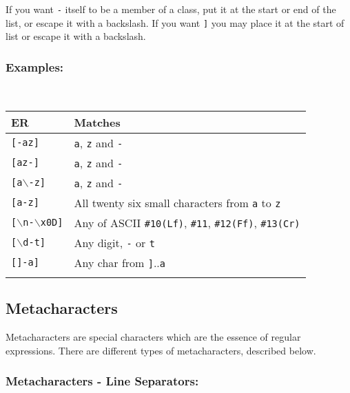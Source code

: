 If you want \texttt{-} itself to be a member of a class, put it at the
start or end of the list, or escape it with a backslash. If you want
\texttt{]} you may place it at the start of list or escape it with a
backslash.


\subsubsection{Examples:}\\

\begin{footnotesize}
  \begin{tabularx}{\textwidth}{>{\hsize=0.3\hsize}X>{\hsize=0.7\hsize}X}\\
    \hline
    \textbf{ER} & \textbf{Matches} \\
    \hline
    \texttt{[-az]} & \texttt{a}, \texttt{z} and \texttt{-} \\
    \texttt{[az-]} & \texttt{a}, \texttt{z} and \texttt{-} \\
    \texttt{[a$\backslash$-z]} & \texttt{a}, \texttt{z} and \texttt{-} \\
    \texttt{[a-z]} & All twenty six small characters from \texttt{a} to \texttt{z} \\
    \texttt{[$\backslash$n-$\backslash$x0D]} & Any of ASCII \texttt{\#10(Lf)}, \texttt{\#11}, \texttt{\#12(Ff)}, \texttt{\#13(Cr)} \\
    \texttt{[$\backslash$d-t]} & Any digit, \texttt{-} or \texttt{t} \\
    \texttt{[]-a]} & Any char from \texttt{]}..\texttt{a} \\
    \hline
    \\
  \end{tabularx}
\end{footnotesize}


\subsection{Metacharacters}

Metacharacters are special characters which are the essence of regular
expressions. There are different types of metacharacters, described below.


\subsubsection{Metacharacters - Line Separators:}\\

